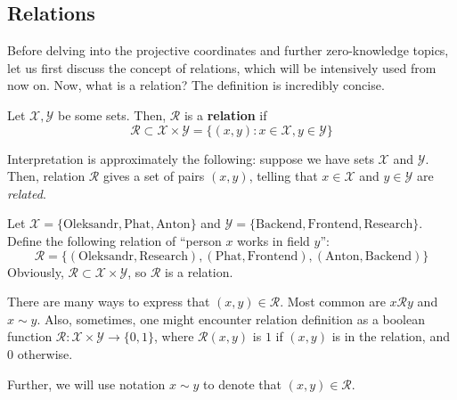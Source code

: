 \documentclass[../lecture-notes.tex]{subfiles}
\begin{document}
\subsection{Relations}

Before delving into the projective coordinates and further zero-knowledge topics, let us first discuss the concept of relations, which will be intensively used from now on. Now, what is a relation? The definition is incredibly concise.

\begin{definition}
    Let $\mathcal{X},\mathcal{Y}$ be some sets. Then, $\mathcal{R}$ is a \textbf{relation} if 
    \begin{equation}
        \mathcal{R} \subset \mathcal{X} \times \mathcal{Y} = \{(x,y): x \in \mathcal{X}, y \in \mathcal{Y}\}
    \end{equation}
\end{definition}

Interpretation is approximately the following: suppose we have sets $\mathcal{X}$ and $\mathcal{Y}$. Then, relation $\mathcal{R}$ gives a set of pairs $(x,y)$, telling that $x \in \mathcal{X}$ and $y \in \mathcal{Y}$ are \textit{related}.

\begin{example}
    Let $\mathcal{X} = \{\text{Oleksandr}, \text{Phat}, \text{Anton}\}$ and $\mathcal{Y} = \{\text{Backend}, \text{Frontend}, \text{Research}\}$. Define the following relation of ``person $x$ works in field $y$'':
    \begin{equation}
        \mathcal{R} = \{(\text{Oleksandr}, \text{Research}), (\text{Phat}, \text{Frontend}), (\text{Anton}, \text{Backend})\}
    \end{equation}
    Obviously, $\mathcal{R} \subset \mathcal{X} \times \mathcal{Y}$, so $\mathcal{R}$ is a relation.
\end{example}

\begin{remark}
    There are many ways to express that $(x,y) \in \mathcal{R}$. Most common are $x \mathcal{R} y$ and $x \sim y$. Also, sometimes, one might encounter relation definition as a boolean function $\mathcal{R}: \mathcal{X} \times \mathcal{Y} \to \{0,1\}$, where $\mathcal{R}(x,y)$ is $1$ if $(x,y)$ is in the relation, and $0$ otherwise.

    Further, we will use notation $x \sim y$ to denote that $(x,y) \in \mathcal{R}$.
\end{remark}
\end{document}
